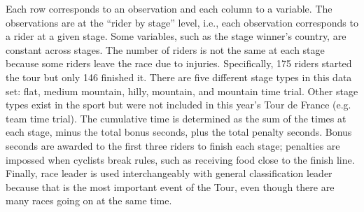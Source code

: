 \documentclass[aos,preprint]{imsart}
\begin{document}
Each row corresponds to an observation and each column to a variable. The observations are at the ``rider by stage'' level, i.e., each observation corresponds to a rider at a given stage. Some variables, such as the stage winner's country, are constant across stages. The number of riders is not the same at each stage because some riders leave the race due to injuries. Specifically, 175 riders started the tour but only 146 finished it. There are five different stage types in this data set: flat, medium mountain, hilly, mountain, and mountain time trial. Other stage types exist in the sport but were not included in this year's Tour de France (e.g. team time trial). The cumulative time is determined as the sum of the times at each stage, minus the total bonus seconds, plus the total penalty seconds. Bonus seconds are awarded to the first three riders to finish each stage; penalties are impossed when cyclists break rules, such as receiving food close to the finish line. Finally, race leader is used interchangeably with general classification leader because that is the most important event of the Tour, even though there are many races going on at the same time.
\end{document}
